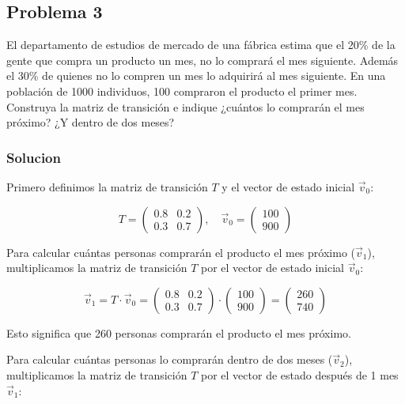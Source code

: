 \documentclass{article}
\begin{document}
\subsection*{Problema 3}

El departamento de estudios de mercado de una fábrica estima que el 20\% de la gente que compra un producto un mes, no lo comprará el mes siguiente. Además el 30\% de quienes no lo compren un mes lo adquirirá al mes siguiente. En una población de 1000 individuos, 100 compraron el producto el primer mes. Construya la matriz de transición e indique ¿cuántos lo comprarán el mes próximo? ¿Y dentro de dos meses?

\subsubsection*{Solucion}

Primero definimos la matriz de transición \(T\) y el vector de estado inicial \(\vec{v}_0\):

\[
    T = \begin{pmatrix}
        0.8 & 0.2 \\
        0.3 & 0.7
    \end{pmatrix},
    \quad
    \vec{v}_0 = \begin{pmatrix}
        100 \\
        900
    \end{pmatrix}
\]

Para calcular cuántas personas comprarán el producto el mes próximo (\(\vec{v}_1\)), multiplicamos la matriz de transición \(T\) por el vector de estado inicial \(\vec{v}_0\):

\[
    \vec{v}_1 = T \cdot \vec{v}_0 = \begin{pmatrix}
        0.8 & 0.2 \\
        0.3 & 0.7
    \end{pmatrix}
    \cdot
    \begin{pmatrix}
        100 \\
        900
    \end{pmatrix}
    =
    \begin{pmatrix}
        260 \\
        740
    \end{pmatrix}
\]

Esto significa que 260 personas comprarán el producto el mes próximo.

Para calcular cuántas personas lo comprarán dentro de dos meses (\(\vec{v}_2\)), multiplicamos la matriz de transición \(T\) por el vector de estado después de 1 mes \(\vec{v}_1\):
\end{document}

